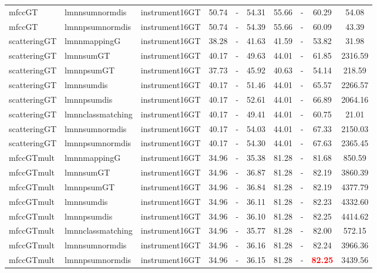 \begin{table}
\begin{center}
\begin{tabular}{lllccccccc}
mfccGT & lmnnsumnormdis & instrument16GT & 50.74 &   - & 54.31 & 55.66 &   - & 60.29 &     54.08 \\ 
mfccGT & lmnnpsumnormdis & instrument16GT & 50.74 &   - & 54.39 & 55.66 &   - & 60.09 &     43.39 \\ 
scatteringGT & lmnnmappingG & instrument16GT & 38.28 &   - & 41.63 & 41.59 &   - & 53.82 &     31.98 \\ 
scatteringGT & lmnnsumGT & instrument16GT & 40.17 &   - & 49.63 & 44.01 &   - & 61.85 &   2316.59 \\ 
scatteringGT & lmnnpsumGT & instrument16GT & 37.73 &   - & 45.92 & 40.63 &   - & 54.14 &    218.59 \\ 
scatteringGT & lmnnsumdis & instrument16GT & 40.17 &   - & 51.46 & 44.01 &   - & 65.57 &   2266.57 \\ 
scatteringGT & lmnnpsumdis & instrument16GT & 40.17 &   - & 52.61 & 44.01 &   - & 66.89 &   2064.16 \\ 
scatteringGT & lmnnclassmatching & instrument16GT & 40.17 &   - & 49.41 & 44.01 &   - & 60.75 &     21.01 \\ 
scatteringGT & lmnnsumnormdis & instrument16GT & 40.17 &   - & 54.03 & 44.01 &   - & 67.33 &   2150.03 \\ 
scatteringGT & lmnnpsumnormdis & instrument16GT & 40.17 &   - & 54.30 & 44.01 &   - & 67.63 &   2365.45 \\ 
mfccGTmult & lmnnmappingG & instrument16GT & 34.96 &   - & 35.38 & 81.28 &   - & 81.68 &    850.59 \\ 
mfccGTmult & lmnnsumGT & instrument16GT & 34.96 &   - & 36.87 & 81.28 &   - & 82.19 &   3860.39 \\ 
mfccGTmult & lmnnpsumGT & instrument16GT & 34.96 &   - & 36.84 & 81.28 &   - & 82.19 &   4377.79 \\ 
mfccGTmult & lmnnsumdis & instrument16GT & 34.96 &   - & 36.11 & 81.28 &   - & 82.23 &   4332.60 \\ 
mfccGTmult & lmnnpsumdis & instrument16GT & 34.96 &   - & 36.10 & 81.28 &   - & 82.25 &   4414.62 \\ 
mfccGTmult & lmnnclassmatching & instrument16GT & 34.96 &   - & 35.77 & 81.28 &   - & 82.00 &    572.15 \\ 
mfccGTmult & lmnnsumnormdis & instrument16GT & 34.96 &   - & 36.16 & 81.28 &   - & 82.24 &   3966.36 \\ 
mfccGTmult & lmnnpsumnormdis & instrument16GT & 34.96 &   - & 36.15 & 81.28 &   - & \textbf{\textcolor{red}{82.25}} &   3439.56 \\ 

\end{tabular}
\end{center}
\end{table}
